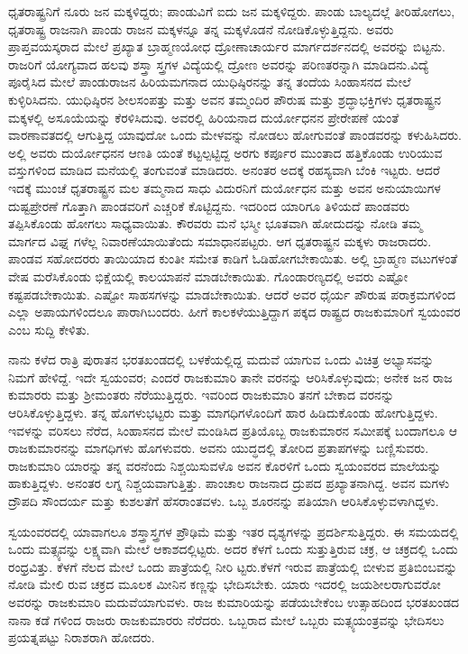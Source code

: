 ಧೃತರಾಷ್ಟ್ರನಿಗೆ ನೂರು ಜನ ಮಕ್ಕಳಿದ್ದರು; ಪಾಂಡುವಿಗೆ ಐದು ಜನ ಮಕ್ಕಳಿದ್ದರು. ಪಾಂಡು ಬಾಲ್ಯದಲ್ಲೆ ತೀರಿಹೋಗಲು, ಧೃತರಾಷ್ಟ್ರ ರಾಜನಾಗಿ ಪಾಂಡು ರಾಜನ ಮಕ್ಕಳನ್ನೂ ತನ್ನ ಮಕ್ಕಳೊಡನೆ ನೋಡಿಕೊಳ್ಳುತ್ತಿದ್ದನು. ಅವರು ಪ್ರಾಪ್ತವಯಸ್ಕರಾದ ಮೇಲೆ ಪ್ರಖ್ಯಾತ ಬ್ರಾಹ್ಮಣಯೋಧ ದ್ರೋಣಾಚಾರ್ಯರ ಮಾರ್ಗದರ್ಶನದಲ್ಲಿ ಅವರನ್ನು ಬಿಟ್ಟನು. ರಾಜರಿಗೆ ಯೋಗ್ಯವಾದ ಹಲವು ಶಸ್ತ್ರಾ ಸ್ತ್ರಗಳ ವಿದ್ಯೆಯಲ್ಲಿ ದ್ರೋಣ ಅವರನ್ನು ಪರಿಣತರನ್ನಾಗಿ ಮಾಡಿದನು.ವಿದ್ಯೆ ಪೂರೈಸಿದ ಮೇಲೆ ಪಾಂಡುರಾಜನ ಹಿರಿಯಮಗನಾದ ಯುಧಿಷ್ಠಿರನನ್ನು ತನ್ನ ತಂದೆಯ ಸಿಂಹಾಸನದ ಮೇಲೆ ಕುಳ್ಳಿರಿಸಿದನು. ಯುಧಿಷ್ಠಿರನ ಶೀಲಸಂಪತ್ತು ಮತ್ತು ಅವನ ತಮ್ಮಂದಿರ ಪೌರುಷ ಮತ್ತು ಶ್ರದ್ಧಾಭಕ್ತಿಗಳು ಧೃತರಾಷ್ಟ್ರನ ಮಕ್ಕಳಲ್ಲಿ ಅಸೂಯೆಯನ್ನು ಕೆರಳಿಸಿದುವು. ಅವರಲ್ಲಿ ಹಿರಿಯನಾದ ದುರ್ಯೋಧನನ ಪ್ರೇರೇಪಣೆ ಯಂತೆ ವಾರಣಾವತದಲ್ಲಿ ಆಗುತ್ತಿದ್ದ ಯಾವುದೋ ಒಂದು ಮೇಳವನ್ನು ನೋಡಲು ಹೋಗುವಂತೆ ಪಾಂಡವರನ್ನು ಕಳುಹಿಸಿದರು. ಅಲ್ಲಿ ಅವರು ದುರ್ಯೋಧನನ ಆಣತಿ ಯಂತೆ ಕಟ್ಟಲ್ಪಟ್ಟಿದ್ದ ಅರಗು ಕರ್ಪೂರ ಮುಂತಾದ ಹತ್ತಿಕೊಂಡು ಉರಿಯುವ ವಸ್ತುಗಳಿಂದ ಮಾಡಿದ ಮನೆಯಲ್ಲಿ ತಂಗುವಂತೆ ಮಾಡಿದರು. ಅನಂತರ ಅದಕ್ಕೆ ರಹಸ್ಯವಾಗಿ ಬೆಂಕಿ ಇಟ್ಟರು. ಆದರೆ ಇದಕ್ಕೆ ಮುಂಚೆ ಧೃತರಾಷ್ಟ್ರನ ಮಲ ತಮ್ಮನಾದ ಸಾಧು ವಿದುರನಿಗೆ ದುರ್ಯೋಧನ ಮತ್ತು ಅವನ ಅನುಯಾಯಿಗಳ ದುಷ್ಟಪ್ರೇರಣೆ ಗೊತ್ತಾಗಿ ಪಾಂಡವರಿಗೆ ಎಚ್ಚರಿಕೆ ಕೊಟ್ಟಿದ್ದನು. ಇದರಿಂದ ಯಾರಿಗೂ ತಿಳಿಯದೆ ಪಾಂಡವರು ತಪ್ಪಿಸಿಕೊಂಡು ಹೋಗಲು ಸಾಧ್ಯವಾಯಿತು. ಕೌರವರು ಮನೆ ಭಸ್ಮೀ ಭೂತವಾಗಿ ಹೋದುದನ್ನು ನೋಡಿ ತಮ್ಮ ಮಾರ್ಗದ ವಿಘ್ನ ಗಳೆಲ್ಲ ನಿವಾರಣೆಯಾಯಿತೆಂದು ಸಮಾಧಾನಪಟ್ಟರು. ಆಗ ಧೃತರಾಷ್ಟ್ರನ ಮಕ್ಕಳು ರಾಜರಾದರು. ಪಾಂಡವ ಸಹೋದರರು ತಾಯಿಯಾದ ಕುಂತೀ ಸಮೇತ ಕಾಡಿಗೆ ಓಡಿಹೋಗಬೇಕಾಯಿತು. ಅಲ್ಲಿ ಬ್ರಾಹ್ಮಣ ವಟುಗಳಂತೆ ವೇಷ ಮರೆಸಿಕೊಂಡು ಭಿಕ್ಷೆಯಲ್ಲಿ ಕಾಲಯಾಪನೆ ಮಾಡಬೇಕಾಯಿತು. ಗೊಂಡಾರಣ್ಯದಲ್ಲಿ ಅವರು ಎಷ್ಟೋ ಕಷ್ಟಪಡಬೇಕಾಯಿತು. ಎಷ್ಟೋ ಸಾಹಸಗಳನ್ನು ಮಾಡಬೇಕಾಯಿತು. ಆದರೆ ಅವರ ಧೈರ್ಯ ಪೌರುಷ ಪರಾಕ್ರಮಗಳಿಂದ ಎಲ್ಲಾ ಅಪಾಯಗಳಿಂದಲೂ ಪಾರಾಗಿಬಂದರು. ಹೀಗೆ ಕಾಲಕಳೆಯುತ್ತಿದ್ದಾಗ ಪಕ್ಕದ ರಾಷ್ಟ್ರದ ರಾಜಕುಮಾರಿಗೆ ಸ್ವಯಂವರ ಎಂಬ ಸುದ್ದಿ ಕೇಳಿತು.

ನಾನು ಕಳೆದ ರಾತ್ರಿ ಪುರಾತನ ಭರತಖಂಡದಲ್ಲಿ ಬಳಕೆಯಲ್ಲಿದ್ದ ಮದುವೆ ಯಾಗುವ ಒಂದು ವಿಚಿತ್ರ ಅಭ್ಯಾಸವನ್ನು ನಿಮಗೆ ಹೇಳಿದ್ದೆ. ಇದೇ ಸ್ವಯಂವರ; ಎಂದರೆ ರಾಜಕುಮಾರಿ ತಾನೇ ವರನನ್ನು ಆರಿಸಿಕೊಳ್ಳುವುದು; ಅನೇಕ ಜನ ರಾಜ ಕುಮಾರರು ಮತ್ತು ಶ‍್ರೀಮಂತರು ನೆರೆಯುತ್ತಿದ್ದರು. ಇವರಿಂದ ರಾಜಕುಮಾರಿ ತನಗೆ ಬೇಕಾದ ವರನನ್ನು ಆರಿಸಿಕೊಳ್ಳುತ್ತಿದ್ದಳು. ತನ್ನ ಹೊಗಳುಭಟ್ಟರು ಮತ್ತು ಮಾಗಧಿಗಳೊಂದಿಗೆ ಹಾರ ಹಿಡಿದುಕೊಂಡು ಹೋಗುತ್ತಿದ್ದಳು. ಇವಳನ್ನು ವರಿಸಲು ನೆರೆದ, ಸಿಂಹಾಸನದ ಮೇಲೆ ಮಂಡಿಸಿದ ಪ್ರತಿಯೊಬ್ಬ ರಾಜಕುಮಾರನ ಸಮೀಪಕ್ಕೆ ಬಂದಾಗಲೂ ಆ ರಾಜಕುಮಾರನನ್ನು ಮಾಗಧಿಗಳು ಹೊಗಳುವರು. ಅವನು ಯುದ್ಧದಲ್ಲಿ ತೋರಿದ ಪ್ರತಾಪಗಳನ್ನು ಬಣ್ಣಿಸುವರು. ರಾಜಕುಮಾರಿ ಯಾರನ್ನು ತನ್ನ ವರನೆಂದು ನಿಶ್ಚಯಿಸುವಳೊ ಅವನ ಕೊರಳಿಗೆ ಒಂದು ಸ್ವಯಂವರದ ಮಾಲೆಯನ್ನು ಹಾಕುತ್ತಿದ್ದಳು. ಅನಂತರ ಲಗ್ನ ನಿಶ್ಚಯವಾಗುತ್ತಿತ್ತು. ಪಾಂಚಾಲ ರಾಜನಾದ ದ್ರುಪದ ಪ್ರಖ್ಯಾತನಾಗಿದ್ದ. ಅವನ ಮಗಳು ದ್ರೌಪದಿ ಸೌಂದರ್ಯ ಮತ್ತು ಕುಶಲತೆಗೆ ಹೆಸರಾಂತವಳು. ಒಬ್ಬ ಶೂರನನ್ನು ಪತಿಯಾಗಿ ಆರಿಸಿಕೊಳ್ಳುವಳಾಗಿದ್ದಳು.

ಸ್ವಯಂವರದಲ್ಲಿ ಯಾವಾಗಲೂ ಶಸ್ತ್ರಾಸ್ತ್ರಗಳ ಪ್ರೌಢಿಮೆ ಮತ್ತು ಇತರ ದೃಶ್ಯಗಳನ್ನು ಪ್ರದರ್ಶಿಸುತ್ತಿದ್ದರು. ಈ ಸಮಯದಲ್ಲಿ ಒಂದು ಮತ್ಸ್ಯವನ್ನು ಲಕ್ಷ್ಯವಾಗಿ ಮೇಲೆ ಆಕಾಶದಲ್ಲಿಟ್ಟರು. ಅದರ ಕೆಳಗೆ ಒಂದು ಸುತ್ತುತ್ತಿರುವ ಚಕ್ರ, ಆ ಚಕ್ರದಲ್ಲಿ ಒಂದು ರಂಧ್ರವಿತ್ತು. ಕೆಳಗೆ ನೆಲದ ಮೇಲೆ ಒಂದು ಪಾತ್ರೆಯಲ್ಲಿ ನೀರಿ ಟ್ಟರು.ಕೆಳಗೆ ಇರುವ ಪಾತ್ರೆಯಲ್ಲಿ ಬೀಳುವ ಪ್ರತಿಬಿಂಬವನ್ನು ನೋಡಿ ಮೇಲಿ ರುವ ಚಕ್ರದ ಮೂಲಕ ಮೀನಿನ ಕಣ್ಣನ್ನು ಭೇದಿಸಬೇಕು. ಯಾರು ಇದರಲ್ಲಿ ಜಯಶೀಲರಾಗುವರೋ ಅವರನ್ನು ರಾಜಕುಮಾರಿ ಮದುವೆಯಾಗುವಳು. ರಾಜ ಕುಮಾರಿಯನ್ನು ಪಡೆಯಬೇಕೆಂಬ ಉತ್ಸಾಹದಿಂದ ಭರತಖಂಡದ ನಾನಾ ಕಡೆ ಗಳಿಂದ ರಾಜರು ರಾಜಕುಮಾರರು ನೆರೆದರು. ಒಬ್ಬರಾದ ಮೇಲೆ ಒಬ್ಬರು ಮತ್ಸ್ಯಯಂತ್ರವನ್ನು ಭೇದಿಸಲು ಪ್ರಯತ್ನಪಟ್ಟು ನಿರಾಶರಾಗಿ ಹೋದರು.

